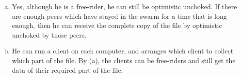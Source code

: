 \begin{pr}$ $
\begin{enumerate}[a.]
\item Yes, although he is a free-rider, he can still be optimistic unchoked. If there are enough peers which have stayed in the swarm for a time that is long enough, then he can receive the complete copy of the file by optimistic unchoked by those peers.
\item He can run a client on each computer, and arranges which client to collect which part of the file. By (a), the clients can be free-riders and still get the data of their required part of the file.
\end{enumerate}
\end{pr}
